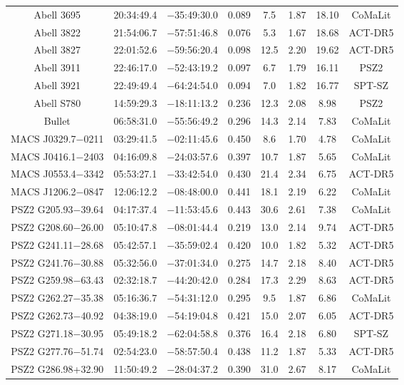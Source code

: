 \begin{table}
\begin{tabular}{cccccccc}
Abell 3695 & 20:34:49.4 & $-$35:49:30.0 & 0.089 & 7.5 & 1.87 & 18.10 & CoMaLit \\
Abell 3822 & 21:54:06.7 & $-$57:51:46.8 & 0.076 & 5.3 & 1.67 & 18.68 & ACT-DR5 \\
Abell 3827 & 22:01:52.6 & $-$59:56:20.4 & 0.098 & 12.5 & 2.20 & 19.62 & ACT-DR5 \\
Abell 3911 & 22:46:17.0 & $-$52:43:19.2 & 0.097 & 6.7 & 1.79 & 16.11 & PSZ2 \\
Abell 3921 & 22:49:49.4 & $-$64:24:54.0 & 0.094 & 7.0 & 1.82 & 16.77 & SPT-SZ \\
Abell S780 & 14:59:29.3 & $-$18:11:13.2 & 0.236 & 12.3 & 2.08 & 8.98 & PSZ2 \\
Bullet & 06:58:31.0 & $-$55:56:49.2 & 0.296 & 14.3 & 2.14 & 7.83 & CoMaLit \\
MACS J0329.7$-$0211 & 03:29:41.5 & $-$02:11:45.6 & 0.450 & 8.6 & 1.70 & 4.78 & CoMaLit \\
MACS J0416.1$-$2403 & 04:16:09.8 & $-$24:03:57.6 & 0.397 & 10.7 & 1.87 & 5.65 & CoMaLit \\
MACS J0553.4$-$3342 & 05:53:27.1 & $-$33:42:54.0 & 0.430 & 21.4 & 2.34 & 6.75 & ACT-DR5 \\
MACS J1206.2$-$0847 & 12:06:12.2 & $-$08:48:00.0 & 0.441 & 18.1 & 2.19 & 6.22 & CoMaLit \\
PSZ2 G205.93$-$39.64 & 04:17:37.4 & $-$11:53:45.6 & 0.443 & 30.6 & 2.61 & 7.38 & CoMaLit \\
PSZ2 G208.60$-$26.00 & 05:10:47.8 & $-$08:01:44.4 & 0.219 & 13.0 & 2.14 & 9.74 & ACT-DR5 \\
PSZ2 G241.11$-$28.68 & 05:42:57.1 & $-$35:59:02.4 & 0.420 & 10.0 & 1.82 & 5.32 & ACT-DR5 \\
PSZ2 G241.76$-$30.88 & 05:32:56.0 & $-$37:01:34.0 & 0.275 & 14.7 & 2.18 & 8.40 & ACT-DR5 \\
PSZ2 G259.98$-$63.43 & 02:32:18.7 & $-$44:20:42.0 & 0.284 & 17.3 & 2.29 & 8.63 & ACT-DR5 \\
PSZ2 G262.27$-$35.38 & 05:16:36.7 & $-$54:31:12.0 & 0.295 & 9.5 & 1.87 & 6.86 & CoMaLit \\
PSZ2 G262.73$-$40.92 & 04:38:19.0 & $-$54:19:04.8 & 0.421 & 15.0 & 2.07 & 6.05 & ACT-DR5 \\
PSZ2 G271.18$-$30.95 & 05:49:18.2 & $-$62:04:58.8 & 0.376 & 16.4 & 2.18 & 6.80 & SPT-SZ \\
PSZ2 G277.76$-$51.74 & 02:54:23.0 & $-$58:57:50.4 & 0.438 & 11.2 & 1.87 & 5.33 & ACT-DR5 \\
PSZ2 G286.98+32.90 & 11:50:49.2 & $-$28:04:37.2 & 0.390 & 31.0 & 2.67 & 8.17 & CoMaLit \\

\end{tabular}
\end{table}
